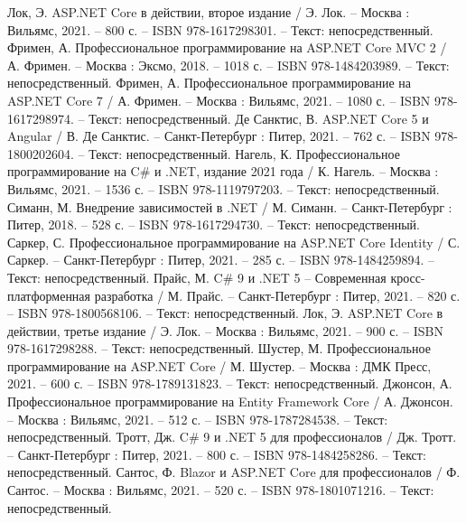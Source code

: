 
\begin{thebibliography}{9}
     Лок, Э. ASP.NET Core в действии, второе издание / Э. Лок. – Москва : Вильямс, 2021. – 800 с. – ISBN 978-1617298301. – Текст: непосредственный.
     Фримен, А. Профессиональное программирование на ASP.NET Core MVC 2 / А. Фримен. – Москва : Эксмо, 2018. – 1018 с. – ISBN 978-1484203989. – Текст: непосредственный.
     Фримен, А. Профессиональное программирование на ASP.NET Core 7 / А. Фримен. – Москва : Вильямс, 2021. – 1080 с. – ISBN 978-1617298974. – Текст: непосредственный.
     Де Санктис, В. ASP.NET Core 5 и Angular / В. Де Санктис. – Санкт-Петербург : Питер, 2021. – 762 с. – ISBN 978-1800202604. – Текст: непосредственный.
     Нагель, К. Профессиональное программирование на C\# и .NET, издание 2021 года / К. Нагель. – Москва : Вильямс, 2021. – 1536 с. – ISBN 978-1119797203. – Текст: непосредственный.
     Симанн, М. Внедрение зависимостей в .NET / М. Симанн. – Санкт-Петербург : Питер, 2018. – 528 с. – ISBN 978-1617294730. – Текст: непосредственный.
     Саркер, С. Профессиональное программирование на ASP.NET Core Identity / С. Саркер. – Санкт-Петербург : Питер, 2021. – 285 с. – ISBN 978-1484259894. – Текст: непосредственный.
     Прайс, М. C\# 9 и .NET 5 – Современная кросс-платформенная разработка / М. Прайс. – Санкт-Петербург : Питер, 2021. – 820 с. – ISBN 978-1800568106. – Текст: непосредственный.
     Лок, Э. ASP.NET Core в действии, третье издание / Э. Лок. – Москва : Вильямс, 2021. – 900 с. – ISBN 978-1617298288. – Текст: непосредственный.
     Шустер, М. Профессиональное программирование на ASP.NET Core / М. Шустер. – Москва : ДМК Пресс, 2021. – 600 с. – ISBN 978-1789131823. – Текст: непосредственный.
     Джонсон, А. Профессиональное программирование на Entity Framework Core / А. Джонсон. – Москва : Вильямс, 2021. – 512 с. – ISBN 978-1787284538. – Текст: непосредственный.
     Тротт, Дж. C\# 9 и .NET 5 для профессионалов / Дж. Тротт. – Санкт-Петербург : Питер, 2021. – 800 с. – ISBN 978-1484258286. – Текст: непосредственный.
     Сантос, Ф. Blazor и ASP.NET Core для профессионалов / Ф. Сантос. – Москва : Вильямс, 2021. – 520 с. – ISBN 978-1801071216. – Текст: непосредственный.

\end{thebibliography}
